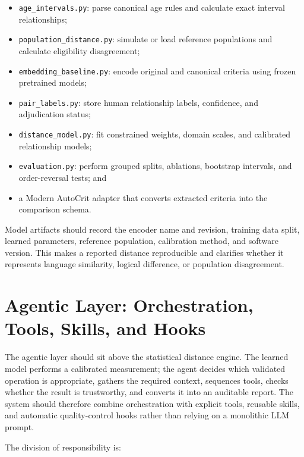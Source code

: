 \documentclass[11pt]{article}
\begin{document}
\begin{itemize}
    \item \texttt{age\_intervals.py}: parse canonical age rules and calculate exact interval relationships;
    \item \texttt{population\_distance.py}: simulate or load reference populations and calculate eligibility disagreement;
    \item \texttt{embedding\_baseline.py}: encode original and canonical criteria using frozen pretrained models;
    \item \texttt{pair\_labels.py}: store human relationship labels, confidence, and adjudication status;
    \item \texttt{distance\_model.py}: fit constrained weights, domain scales, and calibrated relationship models;
    \item \texttt{evaluation.py}: perform grouped splits, ablations, bootstrap intervals, and order-reversal tests; and
    \item a Modern AutoCrit adapter that converts extracted criteria into the comparison schema.
\end{itemize}

Model artifacts should record the encoder name and revision, training data split, learned parameters, reference population, calibration method, and software version. This makes a reported distance reproducible and clarifies whether it represents language similarity, logical difference, or population disagreement.

\section{Agentic Layer: Orchestration, Tools, Skills, and Hooks}

The agentic layer should sit above the statistical distance engine. The learned model performs a calibrated measurement; the agent decides which validated operation is appropriate, gathers the required context, sequences tools, checks whether the result is trustworthy, and converts it into an auditable report. The system should therefore combine orchestration with explicit tools, reusable skills, and automatic quality-control hooks rather than relying on a monolithic LLM prompt.

The division of responsibility is:
\end{document}
